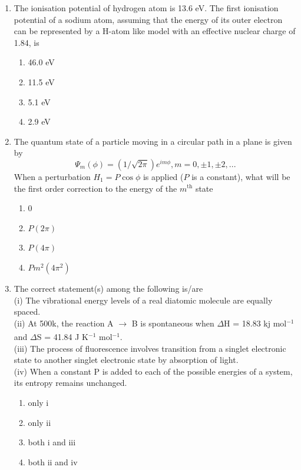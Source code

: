 \documentclass[journal,12pt,onecolumn]{IEEEtran}
\theoremstyle{remark}
\begin{document}
\begin{enumerate}
\item  The ionisation potential of hydrogen atom is 13.6 eV. The first ionisation potential of a sodium atom, assuming that the energy of its outer electron can be represented by a H-atom like model with an effective nuclear charge of 1.84, is\hfill{}
\begin{multicols}{2}
\begin{enumerate}[label=(\Alph*)]
    \item 46.0 eV
    \item 11.5 eV
    \item 5.1 eV
    \item 2.9 eV
\end{enumerate}
\end{multicols}

\item  The quantum state of a particle moving in a circular path in a plane is given by
\[
\Psi_{m}(\phi) = (1/\sqrt{2\pi})e^{im\phi}, m=0,\pm1,\pm2,...
\]
When a perturbation $H_1 = P \cos \phi$ is applied ($P$ is a constant), what will be the first order correction to the energy of the $m^\text{th}$ state\hfill{}
\begin{multicols}{2}
\begin{enumerate}[label=(\Alph*)]
    \item 0
    \item $P(2\pi)$
    \item $P(4\pi)$
    \item $Pm^2(4\pi^2)$
\end{enumerate}
\end{multicols}
  

 \item  The correct statement(s) among the following is/are \\
(i) The vibrational energy levels of a real diatomic molecule are equally spaced. \\
(ii) At 500k, the reaction A $\xrightarrow[ ]{ }$ B is spontaneous when $\Delta $H = 18.83 kj mol$^{-1}$ and $\Delta $S  = 41.84 J K$^{-1}$ mol$^{-1}$. \\
(iii) The process of fluorescence involves transition from a singlet electronic state to another singlet electronic state by absorption of light. \\
(iv) When a constant P is added to each of the possible energies of a system, its entropy remains unchanged. \\
\hfill{}
\begin{multicols}{2}
\begin{enumerate}[label=(\Alph*)]
    \item only i
    \item only ii
    \item both i and iii
    \item both ii and iv
\end{enumerate}
\end{multicols}


\end{enumerate}
\end{document}
